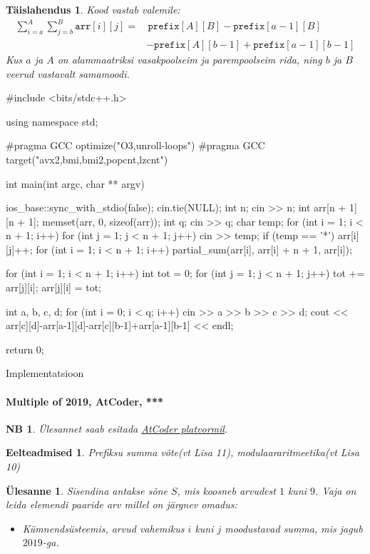\documentclass{trkut}
\newtheorem*{prereq}{Eelteadmised}
\newtheorem*{extra}{NB}
\newtheorem*{solution}{Täislahendus}
\newtheorem*{Text}{Ülesanne}
\begin{document}
\begin{solution}
Kood vastab valemile:
$$
\begin{aligned}
\sum_{i=a}^{A} \sum_{j=b}^{B} \texttt{arr}[i][j]=&\,\texttt{prefix}[A][B]
		- \texttt{prefix}[a-1][B] \\
		&- \texttt{prefix}[A][b-1] + \texttt{prefix}[a-1][b-1]
\end{aligned}
$$
Kus $a$ ja $A$ on alammaatriksi vasakpoolseim ja parempoolseim rida, ning $b$ ja $B$ veerud vastavalt samamoodi.
\end{solution}
\begin{cclol}
#include <bits/stdc++.h>

using namespace std;

#pragma GCC optimize("O3,unroll-loops")
#pragma GCC target("avx2,bmi,bmi2,popcnt,lzcnt")

int main(int argc, char ** argv) {
  ios_base::sync_with_stdio(false);
  cin.tie(NULL);
  int n;
  cin >> n;
  int arr[n + 1][n + 1];
  memset(arr, 0, sizeof(arr));
  int q;
  cin >> q;
  char temp;
  for (int i = 1; i < n + 1; i++) {
    for (int j = 1; j < n + 1; j++) {
      cin >> temp;
      if (temp == '*') arr[i][j]++;
    }
  }
  for (int i = 1; i < n + 1; i++) {
    partial_sum(arr[i], arr[i] + n + 1, arr[i]);
  }

  for (int i = 1; i < n + 1; i++) {
    int tot = 0;
    for (int j = 1; j < n + 1; j++) {
      tot += arr[j][i];
      arr[j][i] = tot;
    }
  }

  int a, b, c, d;
  for (int i = 0; i < q; i++) {
    cin >> a >> b >> c >> d;
cout << arr[c][d]-arr[a-1][d]-arr[c][b-1]+arr[a-1][b-1] << endl;
  }

  return 0;
}
\end{cclol}
\begin{kk}[H]
\caption{Implementatsioon}%
\end{kk}

\paragraph{Multiple of 2019, AtCoder, ***}
\begin{extra}
Ülesannet saab esitada \href{https://atcoder.jp/contests/abc164/tasks/abc164_d}{AtCoder platvormil}.
\end{extra}
\begin{prereq}
Prefiksu summa võte(vt Lisa 11), modulaararitmeetika(vt Lisa 10)
\end{prereq}
\begin{Text}
Sisendina antakse sõne $S$, mis koosneb arvudest $1$ kuni $9$.
Vaja on leida elemendi paaride arv millel on järgnev omadus:
\begin{itemize}
    \item Kümnendsüsteemis, arvud vahemikus $i$ kuni $j$ moodustavad summa, mis jagub $2019$-ga.
\end{itemize}

\parencite{16}
\end{Text}
\end{document}
